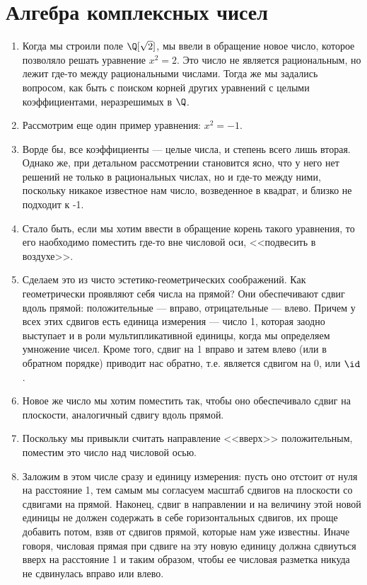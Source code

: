 \section{Алгебра комплексных чисел}


\begin{enumerate}
\item Когда мы строили поле $\Q[\sqrt 2]$, мы ввели в обращение новое число, которое позволяло решать уравнение $x^2=2$. Это число не является рациональным, но лежит где-то между рациональными числами. Тогда же мы задались вопросом, как быть с поиском корней других уравнений с целыми коэффициентами, неразрешимых в $\Q$.
\item Рассмотрим еще один пример уравнения: $x^2=-1$.
\item Ворде бы, все коэффициенты --- целые числа, и степень всего лишь вторая. Однако же, при детальном рассмотрении становится ясно, что у него нет решений не только в рациональных числах, но и где-то между ними, поскольку никакое известное нам число, возведенное в квадрат, и близко не подходит к -1.
\item Стало быть, если мы хотим ввести в обращение корень такого уравнения, то его наобходимо поместить где-то вне числовой оси, <<подвесить в воздухе>>.
\item Сделаем это из чисто эстетико-геометрических соображений. Как геометрически проявляют себя числа на прямой? Они обеспечивают сдвиг вдоль прямой: положительные --- вправо, отрицательные --- влево. Причем у всех этих сдвигов есть единица измерения --- число 1, которая заодно выступает и в роли мультипликативной единицы, когда мы определяем умножение чисел. Кроме того, сдвиг на 1 вправо и затем влево (или в обратном порядке) приводит нас обратно, т.е. является сдвигом на 0, или $\id$.
\item Новое же число мы хотим поместить так, чтобы оно обеспечивало сдвиг на плоскости, аналогичный сдвигу вдоль прямой.
\item Поскольку мы привыкли считать направление <<вверх>> положительным, поместим это число над числовой осью.
\item Заложим в этом числе сразу и единицу измерения: пусть оно отстоит от нуля на расстояние 1, тем самым мы согласуем масштаб сдвигов на плоскости со сдвигами на прямой. Наконец, сдвиг в направлении и на величину этой новой единицы не должен содержать в себе горизонтальных сдвигов, их проще добавить потом, взяв от сдвигов прямой, которые нам уже известны. Иначе говоря, числовая прямая при сдвиге на эту новую единицу должна сдвиуться вверх на расстояние 1 и таким образом, чтобы ее числовая разметка никуда не сдвинулась вправо или влево.

\end{enumerate}

